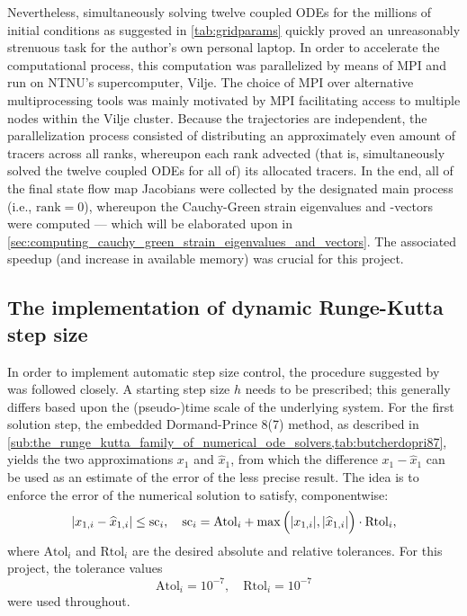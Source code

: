 Nevertheless, simultaneously solving twelve coupled ODEs for the millions of
initial conditions as suggested in \cref{tab:gridparams} quickly proved
an unreasonably strenuous task for the author's own personal laptop. In order
to accelerate the computational process, this computation was parallelized by
means of MPI and run on NTNU's supercomputer, Vilje. The choice of MPI
over alternative multiprocessing tools was mainly motivated by MPI facilitating
access to multiple nodes within the Vilje cluster. Because the trajectories
are independent, the parallelization process consisted of distributing an
approximately even amount of tracers across all ranks, whereupon each
rank advected (that is, simultaneously solved the twelve coupled ODEs for
all of) its allocated tracers. In the end, all of the final state flow map
Jacobians were collected by the designated main process (i.e.,
$\text{rank}=0$), whereupon the Cauchy-Green strain eigenvalues and -vectors
were computed --- which will be elaborated upon in
\cref{sec:computing_cauchy_green_strain_eigenvalues_and_vectors}. The
associated speedup (and increase in available memory) was crucial for this
project.

\subsection{The implementation of dynamic Runge-Kutta step size}
\label{sub:the_implementation_of_dynamic_runge_kutta_step_size}

In order to implement automatic step size control, the procedure suggested by
\textcite[pp.167--168]{hairer1993solving} was followed closely. A starting step
size $h$ needs to be prescribed; this generally differs based upon the
(pseudo-)time scale of the underlying system. For the first solution step,
the embedded Dormand-Prince 8(7) method, as described in
\cref{sub:the_runge_kutta_family_of_numerical_ode_solvers,tab:butcherdopri87},
yields the two approximations $x_{1}$ and $\widehat{x}_{1}$, from which the
difference $x_{1}-\widehat{x}_{1}$ can be used as an estimate of the error
of the less precise result. The idea is to enforce the error of the numerical
solution to satisfy, componentwise:
\begin{equation}
    \label{eq:adaptivetimestep_baseline}
    \abs{x_{1,i}-\widehat{x}_{1,i}}\leq\mathrm{sc}_{i}, \quad%
    \mathrm{sc}_{i} = \mathrm{Atol}_{i}+\max\Big(\abs{x_{1,i}},%
    \abs{\widehat{x}_{1,i}}\Big)\cdot\mathrm{Rtol}_{i},
\end{equation}
where $\mathrm{Atol}_{i}$ and $\mathrm{Rtol}_{i}$ are the desired absolute
and relative tolerances. For this project, the tolerance values
\begin{equation}
    \label{eq:adaptivetimestep_tolerances}
    \mathrm{Atol}_{i} = 10^{-7}, \quad \mathrm{Rtol}_{i} = 10^{-7}
\end{equation}
were used throughout.

